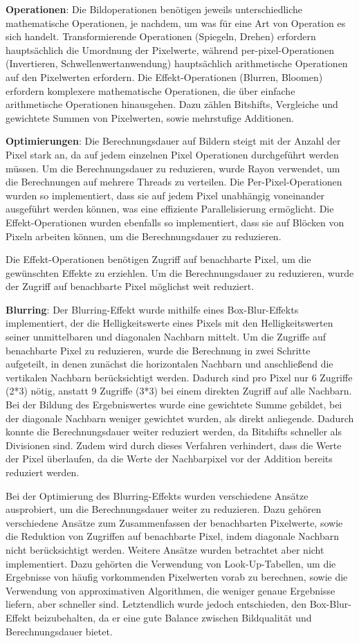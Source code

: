 \textbf{Operationen}:
Die Bildoperationen benötigen jeweils unterschiedliche mathematische Operationen, je nachdem, um was für eine Art von Operation es sich handelt. Transformierende Operationen (Spiegeln, Drehen) erfordern hauptsächlich die Umordnung der Pixelwerte, während per-pixel-Operationen (Invertieren, Schwellenwertanwendung) hauptsächlich arithmetische Operationen auf den Pixelwerten erfordern. Die Effekt-Operationen (Blurren, Bloomen) erfordern komplexere mathematische Operationen, die über einfache arithmetische Operationen hinausgehen. Dazu zählen Bitshifts, Vergleiche und gewichtete Summen von Pixelwerten, sowie mehrstufige Additionen. 

\textbf{Optimierungen}:
Die Berechnungsdauer auf Bildern steigt mit der Anzahl der Pixel stark an, da auf jedem einzelnen Pixel Operationen durchgeführt werden müssen. Um die Berechnungsdauer zu reduzieren, wurde Rayon verwendet, um die Berechnungen auf mehrere Threads zu verteilen. Die Per-Pixel-Operationen wurden so implementiert, dass sie auf jedem Pixel unabhängig voneinander ausgeführt werden können, was eine effiziente Parallelisierung ermöglicht. Die Effekt-Operationen wurden ebenfalls so implementiert, dass sie auf Blöcken von Pixeln arbeiten können, um die Berechnungsdauer zu reduzieren. 

Die Effekt-Operationen benötigen Zugriff auf benachbarte Pixel, um die gewünschten Effekte zu erziehlen. Um die Berechnungsdauer zu reduzieren, wurde der Zugriff auf benachbarte Pixel möglichst weit reduziert.

\textbf{Blurring}:
Der Blurring-Effekt wurde mithilfe eines Box-Blur-Effekts implementiert, der die Helligkeitswerte eines Pixels mit den Helligkeitswerten seiner unmittelbaren und diagonalen Nachbarn mittelt. Um die Zugriffe auf benachbarte Pixel zu reduzieren, wurde die Berechnung in zwei Schritte aufgeteilt, in denen zunächst die horizontalen Nachbarn und anschließend die vertikalen Nachbarn berücksichtigt werden. Dadurch sind pro Pixel nur 6 Zugriffe (2*3) nötig, anstatt 9 Zugriffe (3*3) bei einem direkten Zugriff auf alle Nachbarn. Bei der Bildung des Ergebniswertes wurde eine gewichtete Summe gebildet, bei der diagonale Nachbarn weniger gewichtet wurden, als direkt anliegende. Dadurch konnte die Berechnungsdauer weiter reduziert werden, da Bitshifts schneller als Divisionen sind. Zudem wird durch dieses Verfahren verhindert, dass die Werte der Pixel überlaufen, da die Werte der Nachbarpixel vor der Addition bereits reduziert werden.

Bei der Optimierung des Blurring-Effekts wurden verschiedene Ansätze ausprobiert, um die Berechnungsdauer weiter zu reduzieren. Dazu gehören verschiedene Ansätze zum Zusammenfassen der benachbarten Pixelwerte, sowie die Reduktion von Zugriffen auf benachbarte Pixel, indem diagonale Nachbarn nicht berücksichtigt werden. Weitere Ansätze wurden betrachtet aber nicht implementiert. Dazu gehörten die Verwendung von Look-Up-Tabellen, um die Ergebnisse von häufig vorkommenden Pixelwerten vorab zu berechnen, sowie die Verwendung von approximativen Algorithmen, die weniger genaue Ergebnisse liefern, aber schneller sind. Letztendlich wurde jedoch entschieden, den Box-Blur-Effekt beizubehalten, da er eine gute Balance zwischen Bildqualität und Berechnungsdauer bietet.

